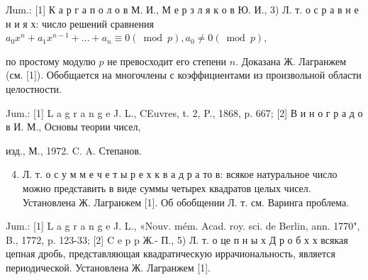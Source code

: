 \documentclass[10pt]{article}
\begin{document}
Лum.: [1] К а р г а п о л о в М. И., М е р з л я к о в Ю. И., 3) Л. т. о с р а в н е н и я х: число решений сравнения $a_{0} x^{n}+a_{1} x^{n-1}+\ldots+a_{n} \equiv 0(\bmod p), a_{0} \neq 0(\bmod p)$,



по простому модулю $p$ не превосходит его степени $n$. Доказана Ж. Лагранжем (см. [1]). Обобщается на многочлены с коэффициентами из произвольной области целостности.



Jum.: [1] L a g r a n g e J. L., CEuvres, t. 2, P., 1868, p. 667; [2] В и н о г р а д о в И. М., Основы теории чисел,



изд., М., 1972. C. A. Степанов.



\begin{enumerate}

  \setcounter{enumi}{3}

  \item Л. т. $о$ с у м м е ч е т ы р е х к в а д р а то в: всякое натуральное число можно представить в виде суммы четырех квадратов целых чисел. Установлена Ж. Лагранжем [1]. Об обобщении Л. т. см. Варинга проблема.

\end{enumerate}



Jum.: [1] L a g r a n g e J. L., «Nouv. mém. Acad. roy. sci. de Berlin, ann. 1770", B., 1772, p. 123-33; [2] C e p p Ж.- П., 5) Л. т. о це п н ы х Д р о б х х всякая цепная дробь, представляющая квадратическую иррачиональность, является периодической. Установлена Ж. Лагранжем [1].
\end{document}
